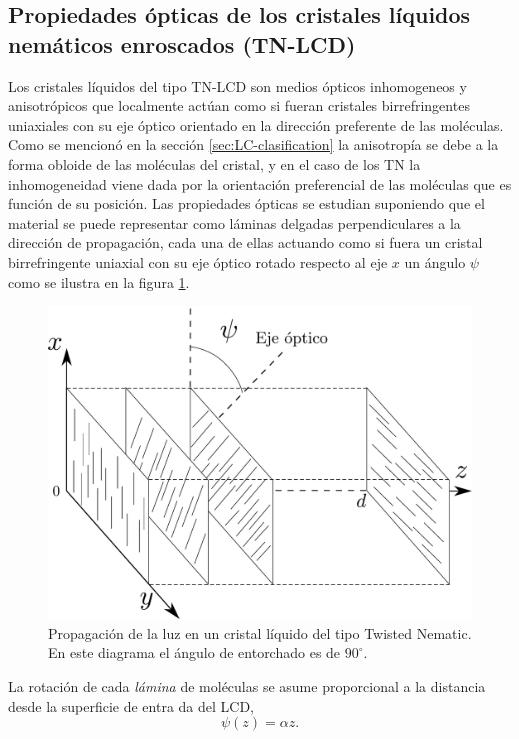 \subsection{Propiedades ópticas de los cristales líquidos nemáticos enroscados (TN-LCD)}
\label{sec:Propiedades_opticas_de_TNLCD}
Los cristales líquidos del tipo TN-LCD son medios ópticos inhomogeneos
y anisotrópicos que localmente actúan como si fueran cristales
birrefringentes uniaxiales con su eje óptico orientado en la dirección
preferente de las moléculas. Como se mencionó en la sección
\ref{sec:LC-clasification} la anisotropía se debe a la forma obloide
de las moléculas del cristal, y en el caso de los TN la inhomogeneidad
viene dada por la orientación preferencial de las moléculas que es
función de su posición. Las propiedades ópticas se estudian suponiendo
que el material se puede representar como láminas delgadas perpendiculares a la
dirección de propagación, cada una de ellas actuando como si fuera un
cristal birrefringente uniaxial con su eje óptico rotado respecto al eje $x$ un ángulo
$\psi$ como se ilustra en la figura
\ref{fig:tn-lcd_sticks}.  
\begin{figure}[h!]
\centering
\includegraphics[scale = .3]{TN-LCD_sticks}
\caption[Propagación de la luz en un TN-LC]{Propagación de la luz en
  un cristal líquido del tipo Twisted 
  Nematic. En este diagrama el ángulo de entorchado es de $90^{\circ}$.}
\label{fig:tn-lcd_sticks}
\end{figure}
La rotación de cada \textit{lámina} de
moléculas se asume proporcional a la distancia desde la superficie de
entra da del LCD,
\begin{equation}
  \label{eq:twist_angle}
\psi(z)  =\alpha z.  
\end{equation}
